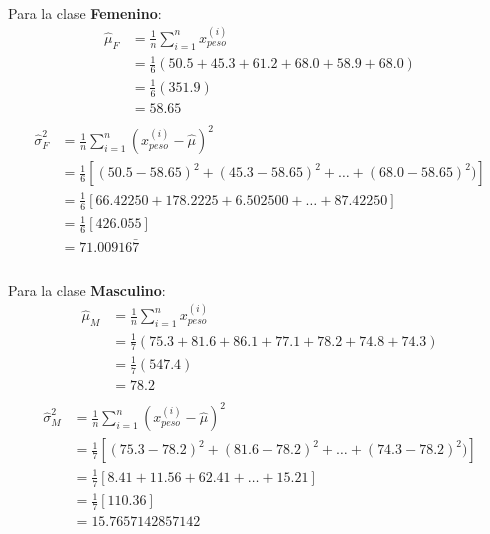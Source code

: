 \documentclass[12pt]{article}
\begin{document}
  \paragraph{} Para la clase \textbf{Femenino}:
  \begin{equation}
  \begin{split}
  \hat{\mu}_{F}&=\frac{1}{n}\sum_{i=1}^{n}{x_{peso}^{(i)}}\\
  &=\frac{1}{6}(50.5 + 45.3 + 61.2 + 68.0 + 58.9 + 68.0)\\
  &=\frac{1}{6}(351.9)\\
  &= 58.65\\
  \end{split}
  \end{equation}
  \begin{equation}
  \begin{split}
  \hat{\sigma}_F^2&=\frac{1}{n}\sum_{i=1}^{n}{(x_{peso}^{(i)} - \hat{\mu})^2}\\
  &=\frac{1}{6}[(50.5-58.65)^2 + (45.3-58.65)^2  + \dots + (68.0-58.65)^2)]\\
  &=\frac{1}{6}[66.42250 + 178.2225 + 6.502500 + \dots + 87.42250]\\
  &=\frac{1}{6}[426.055]\\
  &= 71.00916\bar{7}\\
  \end{split}
  \end{equation}
  \paragraph{} Para la clase \textbf{Masculino}:
  \begin{equation}
  \begin{split}
  \hat{\mu}_{M}&=\frac{1}{n}\sum_{i=1}^{n}{x_{peso}^{(i)}}\\
  &=\frac{1}{7}(75.3 + 81.6 + 86.1 + 77.1 + 78.2 + 74.8 + 74.3)\\
  &=\frac{1}{7}(547.4)\\
  &= 78.2\\
  \end{split}
  \end{equation}
  \begin{equation}
  \begin{split}
  \hat{\sigma}_M^2&=\frac{1}{n}\sum_{i=1}^{n}{(x_{peso}^{(i)} - \hat{\mu})^2}\\
  &=\frac{1}{7}[(75.3-78.2)^2 + (81.6-78.2)^2  + \dots + (74.3-78.2)^2)]\\
  &=\frac{1}{7}[8.41 + 11.56 + 62.41 + \dots + 15.21]\\
  &=\frac{1}{7}[110.36]\\
  &= 15.7657142857142\\
  \end{split}
  \end{equation}
  \clearpage
  \pagebreak
\end{document}

